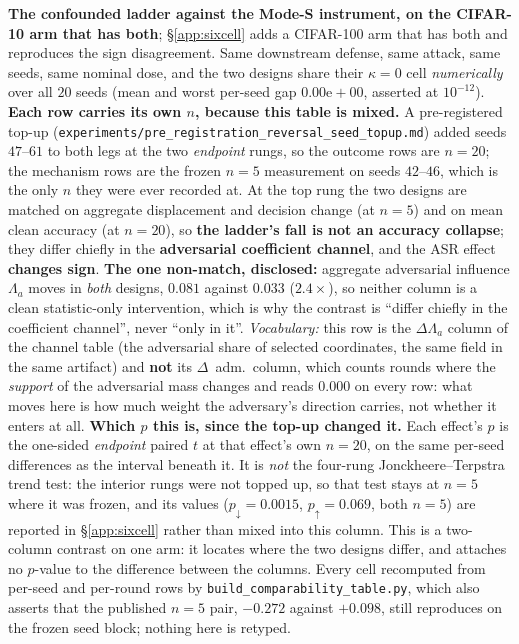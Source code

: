 \documentclass{article}
\begin{document}
\begin{table}[t]
\centering\small
\caption{\textbf{The confounded ladder against the Mode-S instrument, on the CIFAR-10 arm that has both}; §\ref{app:sixcell} adds a CIFAR-100 arm that has both and reproduces the sign disagreement. Same downstream defense, same attack, same seeds, same nominal dose, and the two designs share their $\kappa{=}0$ cell \emph{numerically} over all $20$ seeds (mean and worst per-seed gap $0.00\mathrm{e}{+}00$, asserted at $10^{-12}$). \textbf{Each row carries its own $n$, because this table is mixed.} A pre-registered top-up (\texttt{experiments/\allowbreak pre\_registration\_reversal\_seed\_topup.md}) added seeds $47$--$61$ to both legs at the two \emph{endpoint} rungs, so the outcome rows are $n{=}20$; the mechanism rows are the frozen $n{=}5$ measurement on seeds $42$--$46$, which is the only $n$ they were ever recorded at. At the top rung the two designs are matched on aggregate displacement and decision change (at $n{=}5$) and on mean clean accuracy (at $n{=}20$), so \textbf{the ladder's fall is not an accuracy collapse}; they differ chiefly in the \textbf{adversarial coefficient channel}, and the ASR effect \textbf{changes sign}. \textbf{The one non-match, disclosed:} aggregate adversarial influence $\Lambda_a$ moves in \emph{both} designs, $0.081$ against $0.033$ ($2.4\times$), so neither column is a clean statistic-only intervention, which is why the contrast is ``differ chiefly in the coefficient channel'', never ``only in it''. \emph{Vocabulary:} this row is the $\Delta\Lambda_a$ column of the channel table (the adversarial share of selected coordinates, the same field in the same artifact) and \textbf{not} its $\Delta$~adm.\ column, which counts rounds where the \emph{support} of the adversarial mass changes and reads $0.000$ on every row: what moves here is how much weight the adversary's direction carries, not whether it enters at all. \textbf{Which $p$ this is, since the top-up changed it.} Each effect's $p$ is the one-sided \emph{endpoint} paired $t$ at that effect's own $n{=}20$, on the same per-seed differences as the interval beneath it. It is \emph{not} the four-rung Jonckheere--Terpstra trend test: the interior rungs were not topped up, so that test stays at $n{=}5$ where it was frozen, and its values ($p_{\downarrow}{=}0.0015$, $p_{\uparrow}{=}0.069$, both $n{=}5$) are reported in §\ref{app:sixcell} rather than mixed into this column. This is a two-column contrast on one arm: it locates where the two designs differ, and attaches no $p$-value to the difference between the columns. Every cell recomputed from per-seed and per-round rows by \texttt{build\_comparability\_table.py}, which also asserts that the published $n{=}5$ pair, $-0.272$ against $+0.098$, still reproduces on the frozen seed block; nothing here is retyped.}

\end{table}
\end{document}

